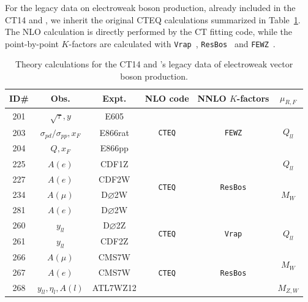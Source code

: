 For the legacy data on electroweak boson production, already included in the CT14 and \CTHERAII, 
we inherit the original CTEQ calculations summarized in Table~\ref{Theory-Calc-VB}. 
The NLO calculation is directly performed by the CT fitting code, while the point-by-point $K$-factors are calculated with 
\texttt{Vrap}~\cite{Anastasiou:2003ds,Anastasiou:2003yy}, \texttt{ResBos}~\cite{Ladinsky:1993zn,Konychev:2005iy} and
\texttt{FEWZ}~\cite{Gavin:2010az,Gavin:2012sy,Li:2012wna}.

\begin{table}[tb]
\begin{tabular}{|c|c|c|c|c|c| }
\hline
ID\# & Obs.   &   Expt.   &  NLO code &  NNLO $K$-factors  & $\mu_{R,F}$\\
\hline
201 & $\sqrt{\tau}, y$  &  E605  &  \multirow{3}{*}{ \texttt{CTEQ}}  & \multirow{3}{*}{ \texttt{FEWZ}  }   & \multirow{3}{*}{$Q_{ll}$} \\
203  & $\sigma_{pd}/\sigma_{pp},x_{F}$  & E866rat &  &    & \\
204  & $Q,x_{F}$ &  E866pp  &  &    & \\
\hline
225 & $A(e)$  & CDF1Z  &  \multirow{4}{*}{ \texttt{CTEQ}}  &  \multirow{4}{*}{ \texttt{ResBos}}  &  $Q_{ll}$   \\
227 & $A(e)$  &CDF2W &     &  &  \multirow{3}{*}{$M_{W}$} \\
234 &  $A(\mu)$ & D$\varnothing$2W &    && \\
281 & $A(e)$  & D$\varnothing$2W  &   &&  \\
\hline
260 &  $y_{ll}$ &  D$\varnothing$2Z &   \multirow{2}{*}{ \texttt{CTEQ}}  &  \multirow{2}{*}{\texttt{Vrap}}  &
\multirow{2}{*}{ $Q_{ll}$ } \\
261 &  $y_{ll}$ &  CDF2Z  &      &  &\\
\hline 
266 & $A(\mu)$  & CMS7W  &   \multirow{3}{*}{\texttt{CTEQ} }  &\multirow{3}{*}{ \texttt{ResBos}} & \multirow{2}{*}{ $M_{W}$}   \\
267  & $A(e)$  & CMS7W  &        &  &\\
268 &  $y_{ll},\eta_{l},A(l)$   & ATL7WZ12  &   &   & $M_{Z,W}$ \\
\hline
\end{tabular}
\caption{Theory calculations for the CT14 and \CTHERAII's legacy data of electroweak vector boson production.
\label{Theory-Calc-VB}}
\end{table}

